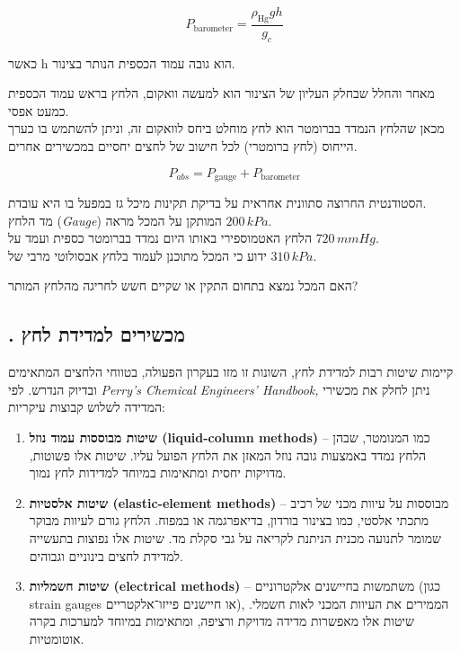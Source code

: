 \documentclass[
  hebrew,
  letterpaper,
  DIV=11,
  numbers=noendperiod]{scrreprt}
\begin{document}
\[P_{\text{barometer}} = \frac{\rho_{\text{Hg}}gh}{g_{c}}\]

כאשר h הוא גובה עמוד הכספית הנותר בצינור.

{מאחר והחלל שבחלק העליון של הצינור הוא למעשה וואקום, הלחץ בראש עמוד
הכספית כמעט אפסי}.\\
{מכאן שהלחץ הנמדד בברומטר הוא לחץ מוחלט ביחס לוואקום זה, וניתן להשתמש בו
כערך הייחוס (לחץ ברומטרי) לכל חישוב של לחצים יחסיים במכשירים אחרים}.

\[P_{abs} = P_{\text{gauge}} + P_{\text{barometer}}\]

הסטודנטית החרוצה סתוונית אחראית על בדיקת תקינות מיכל גז במפעל בו היא
עובדת.\\
מד הלחץ (\emph{Gauge}) המותקן על המכל מראה \(200\,kPa\).\\
הלחץ האטמוספירי באותו היום נמדד בברומטר כספית ועמד על \(720\,mmHg\).\\
ידוע כי המכל מתוכנן לעמוד בלחץ אבסולוטי מרבי של \(310\,kPa\).

האם המכל נמצא בתחום התקין או שקיים חשש לחריגה מהלחץ המותר?

\subsection{\texorpdfstring{. {מכשירים למדידת
לחץ}}{. מכשירים למדידת לחץ}}\label{ux5deux5dbux5e9ux5d9ux5e8ux5d9ux5dd-ux5dcux5deux5d3ux5d9ux5d3ux5ea-ux5dcux5d7ux5e5}

{קיימות שיטות רבות למדידת לחץ, השונות זו מזו בעקרון הפעולה, בטווחי
הלחצים המתאימים ובדיוק הנדרש}. {לפי} \emph{Perry's Chemical Engineers'
Handbook{,}} {ניתן לחלק את מכשירי המדידה לשלוש קבוצות עיקריות}:

\begin{enumerate}
\def\labelenumi{\arabic{enumi}.}
\item
  \textbf{{שיטות מבוססות עמוד נוזל} (liquid-column methods)} -- {כמו
  המנומטר, שבהן הלחץ נמדד באמצעות גובה נוזל המאזן את הלחץ הפועל עליו.
  שיטות אלו פשוטות, מדויקות יחסית ומתאימות במיוחד למדידות לחץ נמוך}.
\item
  \textbf{{שיטות אלסטיות} (elastic-element methods)} -- {מבוססות על
  עיוות מכני של רכיב מתכתי אלסטי, כמו בצינור בורדון, בדיאפרגמה או במפוח.
  הלחץ גורם לעיוות מבוקר שמומר לתנועה מכנית הניתנת לקריאה על גבי סקלת
  מד. שיטות אלו נפוצות בתעשייה למדידת לחצים בינוניים וגבוהים}.
\item
  \textbf{{שיטות חשמליות} (electrical methods)} -- {משתמשות בחיישנים
  אלקטרוניים} ({כגון} strain gauges {או חיישנים פייזו־אלקטריים}),
  {הממירים את העיוות המכני לאות חשמלי. שיטות אלו מאפשרות מדידה מדויקת
  ורציפה, ומתאימות במיוחד למערכות בקרה אוטומטיות}.
\end{enumerate}
\end{document}
